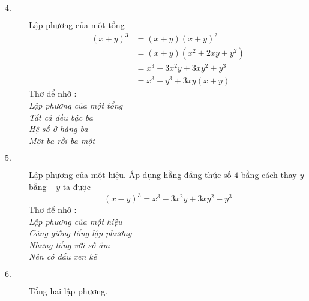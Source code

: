 \begin{description}
\begin{description}
            \item[$4.$] Lập phương của một tổng
            \begin{equation*}
                \begin{split}
                (x+y)
                    ^3&=(x+y)(x+y)^2\\
                    &=(x+y)(x^2+2xy+y^2)\\
                    &=x^3+3x^2y+3xy^2+y^3\\
                    &=x^3+y^3+3xy(x+y)
                \end{split}
            \end{equation*}
            Thơ để nhớ :\\
            \emph{Lập phương của một tổng\\
            Tất cả đều bậc ba\\
            Hệ số ở hàng ba\\
            Một ba rồi ba một}
            \item[$5.$] Lập phương của một hiệu. Áp dụng hằng đẳng thức số $4$ bằng cách thay $y$ bằng $-y$ ta được
            $$ (x-y)^3=x^3-3x^2y+3xy^2-y^3 $$
            Thơ để nhớ :\\
            \emph{Lập phương của một hiệu\\
            Cũng giống tổng lập phương\\
            Nhưng tổng với số âm\\
            Nên có dấu xen kẽ}
            \item[$6.$] Tổng hai lập phương.


\end{description}
\end{description}
